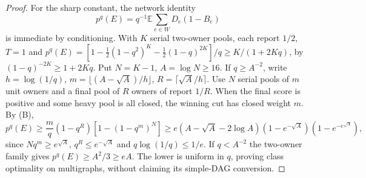 \documentclass[11pt]{article}
\theoremstyle{definition}\newtheorem{definition}[theorem]{Definition}
\theoremstyle{remark}\newtheorem{remark}[theorem]{Remark}
\newcommand{\E}{\mathbb E}
\begin{document}
\begin{proof}
For the sharp constant, the network identity
\[
 p^q(E)=q^{-1}\E\sum_{e\in W}D_e(1-B_e)                 \tag{B}
\]
is immediate by conditioning. With $K$ serial two-owner pools, each report
$1/2$, $T=1$ and
$p^q(E)=[1-\tfrac12(1-q^2)^K-\tfrac12(1-q)^{2K}]/q
\ge K/(1+2Kq)$, by $(1-q)^{-2K}\ge1+2Kq$.
Put $N=K-1$, $A=\log N\ge16$. If $q\ge A^{-2}$, write
$h=\log(1/q)$, $m=\lfloor(A-\sqrt A)/h\rfloor$,
$R=\lceil\sqrt A/h\rceil$. Use $N$ serial pools of $m$ unit owners
and a final pool of $R$ owners of report $1/R$.
When the final score is positive and some heavy pool is all closed, the
winning cut has closed weight $m$. By (B),
\[
 p^q(E)\ge\frac m q(1-q^R)[1-(1-q^m)^N]
 \ge e(A-\sqrt A-2\log A)(1-e^{-\sqrt A})(1-e^{-e^{\sqrt A}}),
\]
since $Nq^m\ge e^{\sqrt A}$, $q^R\le e^{-\sqrt A}$ and
$q\log(1/q)\le1/e$. If $q<A^{-2}$ the two-owner family gives
$p^q(E)\ge A^2/3\ge eA$. The lower is uniform in $q$, proving class
optimality on multigraphs, without claiming its simple-DAG conversion.
\end{proof}
\end{document}
